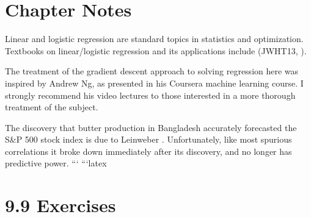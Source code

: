 \documentclass[10pt]{article}
\begin{document}
\section{Chapter Notes}
Linear and logistic regression are standard topics in statistics and optimization. Textbooks on linear/logistic regression and its applications include (JWHT13, \cite{weisberg2005applied}).

The treatment of the gradient descent approach to solving regression here was inspired by Andrew Ng, as presented in his Coursera machine learning course. I strongly recommend his video lectures to those interested in a more thorough treatment of the subject.

The discovery that butter production in Bangladesh accurately forecasted the S\&P 500 stock index is due to Leinweber \cite{leinweber2007stupid}. Unfortunately, like most spurious correlations it broke down immediately after its discovery, and no longer has predictive power.
```
```latex
\section*{9.9 Exercises}
\end{document}
